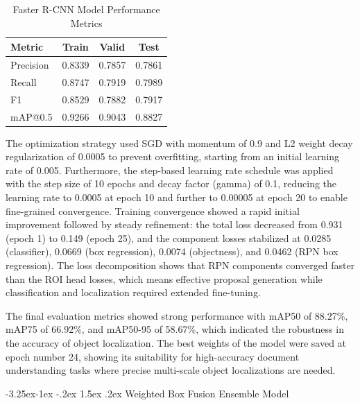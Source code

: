 \documentclass[conference,twocolumn]{IEEEtran}
\makeatletter
\renewcommand{\subsection}{\@startsection{subsection}{2}{\z@}%
  {-3.25ex\@plus -1ex \@minus -.2ex}%
  {1.5ex \@plus .2ex}%
  {\normalfont\normalsize\bfseries\itshape}}
\makeatother
\begin{document}
\begin{table}[htbp]
\caption{Faster R-CNN Model Performance Metrics}
\label{tab:fasterrcnn}
\centering
\footnotesize
\begin{tabular}{lccc}
\toprule
Metric & Train & Valid & Test \\
\midrule
Precision & 0.8339 & 0.7857 & 0.7861 \\
Recall & 0.8747 & 0.7919 & 0.7989 \\
F1 & 0.8529 & 0.7882 & 0.7917 \\
mAP@0.5 & 0.9266 & 0.9043 & 0.8827 \\
\bottomrule
\end{tabular}
\end{table}

The optimization strategy used SGD with momentum of 0.9 and L2 weight
decay regularization of 0.0005 to prevent overfitting, starting from an
initial learning rate of 0.005. Furthermore, the step-based learning
rate schedule was applied with the step size of 10 epochs and decay
factor (gamma) of 0.1, reducing the learning rate to 0.0005 at epoch 10
and further to 0.00005 at epoch 20 to enable fine-grained convergence.
Training convergence showed a rapid initial improvement followed by
steady refinement: the total loss decreased from 0.931 (epoch 1) to
0.149 (epoch 25), and the component losses stabilized at 0.0285
(classifier), 0.0669 (box regression), 0.0074 (objectness), and 0.0462
(RPN box regression). The loss decomposition shows that RPN components
converged faster than the ROI head losses, which means effective
proposal generation while classification and localization required
extended fine-tuning.

The final evaluation metrics showed strong performance with mAP50 of
88.27\%, mAP75 of 66.92\%, and mAP50-95 of 58.67\%, which indicated the
robustness in the accuracy of object localization. The best weights of
the model were saved at epoch number 24, showing its suitability for
high-accuracy document understanding tasks where precise multi-scale
object localizations are needed.

\subsection{Weighted Box Fusion Ensemble Model}
\end{document}
